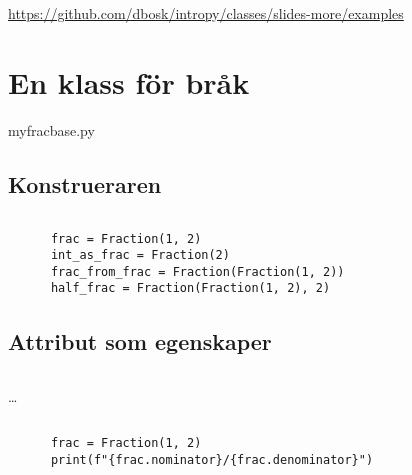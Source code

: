 \mode*

\begin{frame}
  \url{https://github.com/dbosk/intropy/classes/slides-more/examples}
\end{frame}

\section{En klass för bråk}

\begin{frame}
  myfrac\textunderscore base.py
\end{frame}

\subsection{Konstrueraren}

\begin{frame}[fragile]
  \inputminted[linenos,firstline=3,lastline=13]{python}{examples/myfrac_base.py}

  \begin{example}
    \begin{verbatim}
      frac = Fraction(1, 2)
      int_as_frac = Fraction(2)
      frac_from_frac = Fraction(Fraction(1, 2))
      half_frac = Fraction(Fraction(1, 2), 2)
    \end{verbatim}
  \end{example}
\end{frame}

\subsection{Attribut som egenskaper}

\begin{frame}[fragile]
  \inputminted[linenos,firstline=3,lastline=3]{python}{examples/myfrac_base.py}
  \dots
  \inputminted[linenos,autogobble=off,firstline=15,lastline=24]{python}{examples/myfrac_base.py}

  \begin{example}
    \begin{verbatim}
      frac = Fraction(1, 2)
      print(f"{frac.nominator}/{frac.denominator}")
    \end{verbatim}
  \end{example}
\end{frame}

